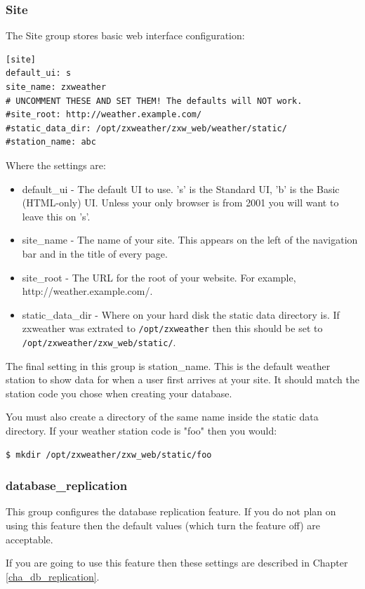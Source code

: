 \documentclass[a4paper,10pt,draft]{book}
\begin{document}
\subsubsection{Site}
The Site group stores basic web interface configuration:
\begin{verbatim}
[site]
default_ui: s
site_name: zxweather
# UNCOMMENT THESE AND SET THEM! The defaults will NOT work.
#site_root: http://weather.example.com/
#static_data_dir: /opt/zxweather/zxw_web/weather/static/
#station_name: abc
\end{verbatim}

Where the settings are:
\begin{itemize}
\item default\_ui - The default UI to use. 's' is the Standard UI, 'b' is the Basic (HTML-only) UI. Unless your only browser is from 2001 you will want to leave this on 's'.
\item site\_name - The name of your site. This appears on the left of the navigation bar and in the title of every page.
\item site\_root - The URL for the root of your website. For example, http://weather.example.com/.
\item static\_data\_dir - Where on your hard disk the static data directory is. If zxweather was extrated to \verb|/opt/zxweather| then this should be set to \verb|/opt/zxweather/zxw_web/static/|.
\end{itemize}

The final setting in this group is station\_name. This is the default weather station to show data for when a user first arrives at your site. It should match the station code you chose when creating your database.

You must also create a directory of the same name inside the static data directory. If your weather station code is "foo" then you would:
\begin{verbatim}
$ mkdir /opt/zxweather/zxw_web/static/foo
\end{verbatim}

\subsubsection{database\_replication}
This group configures the database replication feature. If you do not plan on using this feature then the default values (which turn the feature off) are acceptable.

If you are going to use this feature then these settings are described in Chapter \ref{cha_db_replication}.
\end{document}
